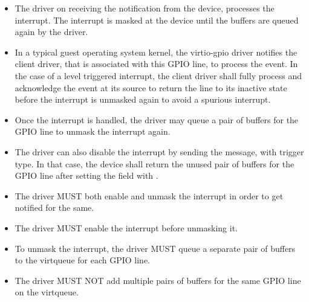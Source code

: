 \begin{itemize}
\item The driver on receiving the notification from the device, processes the
    interrupt. The interrupt is masked at the device until the buffers are
    queued again by the driver.

\item In a typical guest operating system kernel, the virtio-gpio driver
    notifies the client driver, that is associated with this GPIO line, to
    process the event. In the case of a level triggered interrupt, the client
    driver shall fully process and acknowledge the event at its source to return
    the line to its inactive state before the interrupt is unmasked again to
    avoid a spurious interrupt.

\item Once the interrupt is handled, the driver may queue a pair of buffers for
    the GPIO line to unmask the interrupt again.

\item The driver can also disable the interrupt by sending the
     message, with
     trigger type. In that case, the device
    shall return the unused pair of buffers for the GPIO line after setting the
     field with .
\end{itemize}


\begin{itemize}
\item The driver MUST both enable and unmask the interrupt in order to get
    notified for the same.

\item The driver MUST enable the interrupt before unmasking it.

\item To unmask the interrupt, the driver MUST queue a separate pair of buffers
    to the  virtqueue for each GPIO line.

\item The driver MUST NOT add multiple pairs of buffers for the same GPIO line
    on the  virtqueue.
\end{itemize}

